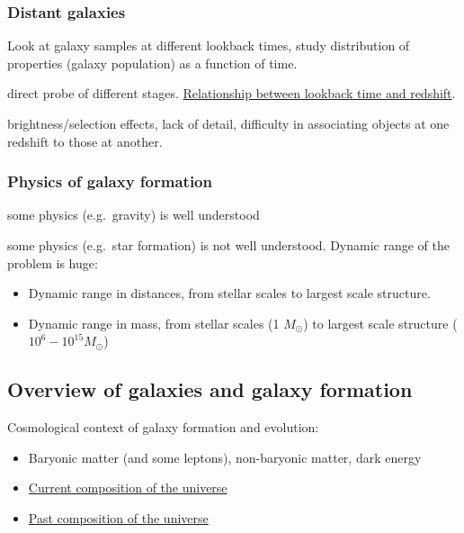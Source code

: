 \documentclass{article}
\begin{document}
\subsubsection{Distant galaxies}
Look at galaxy samples at different lookback times, study distribution of
properties (galaxy population) as a function of time.
\begin{description}[labelindent=2em, labelwidth=8em, leftmargin=12em]
    \item [Advantages] direct probe of different stages.
        \href{http://astronomy.nmsu.edu/holtz/a555/html/diagrams/misc/tz_lcdm.htm}
        {Relationship between lookback time and redshift}.
    \item [Disadvantages] brightness/selection effects, lack of detail,
        difficulty in associating objects at one redshift to those at another.
\end{description}
\subsubsection{Physics of galaxy formation}
\begin{description}[labelindent=2em, labelwidth=8em, leftmargin=12em]
    \item [Advantages] some physics (e.g.\ gravity) is well understood
    \item [Disadvantages] some physics (e.g.\ star formation) is not well
        understood. Dynamic range of the problem is huge:
        \begin{itemize}
            \item Dynamic range in distances, from stellar scales
                to largest scale structure.
            \item Dynamic range in mass, from stellar scales
                (1 $M_{\odot}$) to
                largest scale structure ($10^6-10^{15} M_{\odot}$)
        \end{itemize}
\end{description}

\subsection{Overview of galaxies and galaxy formation}
Cosmological context of galaxy formation and evolution:
\begin{itemize}
    \item Baryonic matter (and some leptons), non-baryonic matter, dark energy
    \item \href{http://astronomy.nmsu.edu/holtz/a555/resources/Cosmological_Composition_1.png}
        {Current composition of the universe}
    \item \href{http://astronomy.nmsu.edu/holtz/a555/resources/Cosmological_Composition_2.png}
        {Past composition of the universe}
\end{itemize}
\end{document}
